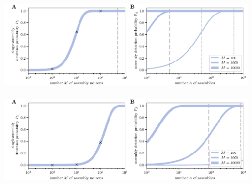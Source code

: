 \documentclass[8pt,t,usepdftitle=false]{beamer}
\begin{document}
\subsection{\ttl}
\begin{frame}[plain]
  \frametitle{\ttl}
  \parbox{\linewidth}{
    \includegraphics[width=\linewidth]{./figures/minimal_model_assembly_detectability_rho_2100.pdf}\\
    {\small}
  }
\end{frame}
\begin{frame}[plain]
  \frametitle{\ttl}
  \parbox{\linewidth}{
    \includegraphics[width=\linewidth]{./figures/minimal_model_assembly_detectability_rho_35000.pdf}\\
    {\small}
  }
\end{frame}
\end{document}

